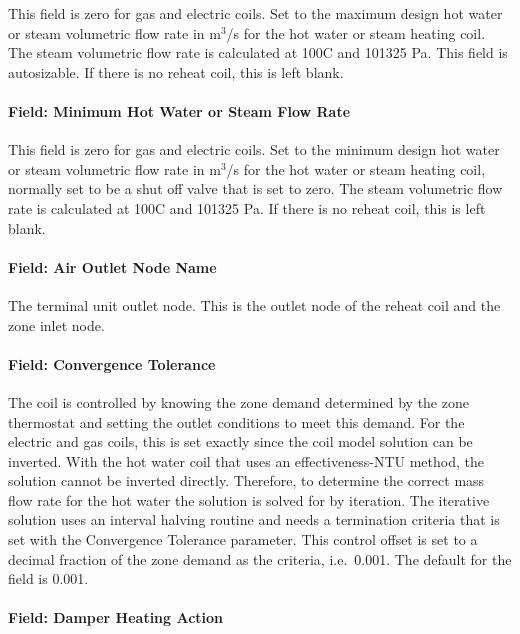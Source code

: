 This field is zero for gas and electric coils. Set to the maximum design hot water or steam volumetric flow rate in m\(^{3}\)/s for the hot water or steam heating coil. The steam volumetric flow rate is calculated at 100C and 101325 Pa. This field is autosizable. If there is no reheat coil, this is left blank.

\paragraph{Field: Minimum Hot Water or Steam Flow Rate}\label{field-minimum-hot-water-or-steam-flow-rate-1}

This field is zero for gas and electric coils. Set to the minimum design hot water or steam volumetric flow rate in m\(^{3}\)/s for the hot water or steam heating coil, normally set to be a shut off valve that is set to zero. The steam volumetric flow rate is calculated at 100C and 101325 Pa. If there is no reheat coil, this is left blank.

\paragraph{Field: Air Outlet Node Name}\label{field-air-outlet-node-name-1}

The terminal unit outlet node. This is the outlet node of the reheat coil and the zone inlet node.

\paragraph{Field: Convergence Tolerance}\label{field-convergence-tolerance-1}

The coil is controlled by knowing the zone demand determined by the zone thermostat and setting the outlet conditions to meet this demand. For the electric and gas coils, this is set exactly since the coil model solution can be inverted. With the hot water coil that uses an effectiveness-NTU method, the solution cannot be inverted directly. Therefore, to determine the correct mass flow rate for the hot water the solution is solved for by iteration. The iterative solution uses an interval halving routine and needs a termination criteria that is set with the Convergence Tolerance parameter. This control offset is set to a decimal fraction of the zone demand as the criteria, i.e.~0.001. The default for the field is 0.001.

\paragraph{Field: Damper Heating Action}\label{field-damper-heating-action}

